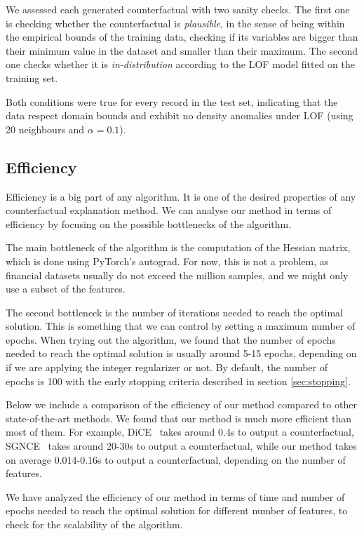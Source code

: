 \documentclass[12pt]{extarticle}
\numberwithin{equation}{section}
\begin{document}
We assessed each generated counterfactual with two sanity checks. The first one is checking whether the counterfactual is \emph{plausible}, in the sense of being within the empirical bounds of the training data, checking if its variables are bigger than their minimum value in the dataset and smaller than their maximum. The second one checks whether it is \emph{in-distribution} according to the LOF model fitted on the training set.

Both conditions were true for every record in the test set, indicating that the data respect domain bounds and exhibit no density anomalies under LOF (using 20 neighbours and $\alpha = 0.1$).

\subsection{Efficiency}\label{sec:efficiency}
Efficiency is a big part of any algorithm. It is one of the desired properties of any counterfactual explanation method. We can analyse our method in terms of efficiency by focusing on the possible bottlenecks of the algorithm. 

The main bottleneck of the algorithm is the computation of the Hessian matrix, which is done using PyTorch's autograd. For now, this is not a problem, as financial datasets usually do not exceed the million samples, and we might only use a subset of the features. 

The second bottleneck is the number of iterations needed to reach the optimal solution. This is something that we can control by setting a maximum number of epochs. When trying out the algorithm, we found that the number of epochs needed to reach the optimal solution is usually around 5-15 epochs, depending on if we are applying the integer regularizer or not. By default, the number of epochs is 100 with the early stopping criteria described in section \ref{sec:stopping}.

Below we include a comparison of the efficiency of our method compared to other state-of-the-art methods. We found that our method is much more efficient than most of them. For example, DiCE~\cite{dice} takes around 0.4s to output a counterfactual, SGNCE~\cite{sgnce} takes around 20-30s to output a counterfactual, while our method takes on average 0.014-0.16s to output a counterfactual, depending on the number of features. 

We have analyzed the efficiency of our method in terms of time and number of epochs needed to reach the optimal solution for different number of features, to check for the scalability of the algorithm.
\end{document}
